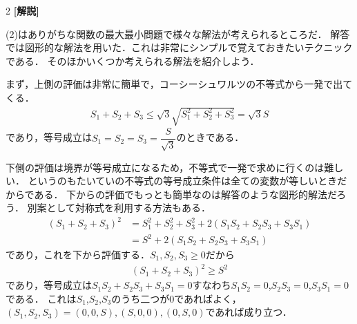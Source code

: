 \documentclass[../../main.tex]{subfiles}
\begin{document}
\begin{multicols}{2}
  {\bf [解説]}

  (2)はありがちな関数の最大最小問題で様々な解法が考えられるところだ．
  解答では図形的な解法を用いた．これは非常にシンプルで覚えておきたいテクニックである．
  そのほかいくつか考えられる解法を紹介しよう．

  まず，上側の評価は非常に簡単で，コーシーシュワルツの不等式から一発で出てくる．
  \begin{align}
    S_1+S_2+S_3 \le \sqrt{3}\sqrt{S_1^2+S_2^2+S_3^2} = \sqrt{3}S
  \end{align}
  であり，等号成立は$S_1=S_2=S_3=\dfrac{S}{\sqrt{3}}$のときである．

  下側の評価は境界が等号成立になるため，不等式で一発で求めに行くのは難しい．
  というのもたいていの不等式の等号成立条件は全ての変数が等しいときだからである．
  下からの評価でもっとも簡単なのは解答のような図形的解法だろう．
  別案として対称式を利用する方法もある．
  \begin{align}
    (S_1+S_2+S_3)^2
    & = S_1^2+S_2^2+S_3^2 + 2(S_1S_2+S_2S_3+S_3S_1) \\
    & = S^2 + 2(S_1S_2+S_2S_3+S_3S_1)
  \end{align}
  であり，これを下から評価する．$S_1,S_2,S_3\ge 0$だから
  \begin{align}
    (S_1+S_2+S_3)^2 \ge S^2
  \end{align}
  であり，等号成立は$S_1S_2+S_2S_3+S_3S_1=0$すなわち$S_1S_2=0$,$S_2S_3=0$,$S_3S_1=0$である．
  これは$S_1$,$S_2$,$S_3$のうち二つが$0$であればよく，$(S_1,S_2,S_3)=(0,0,S),(S,0,0),(0,S,0)$であれば成り立つ．


\end{multicols}
\end{document}
